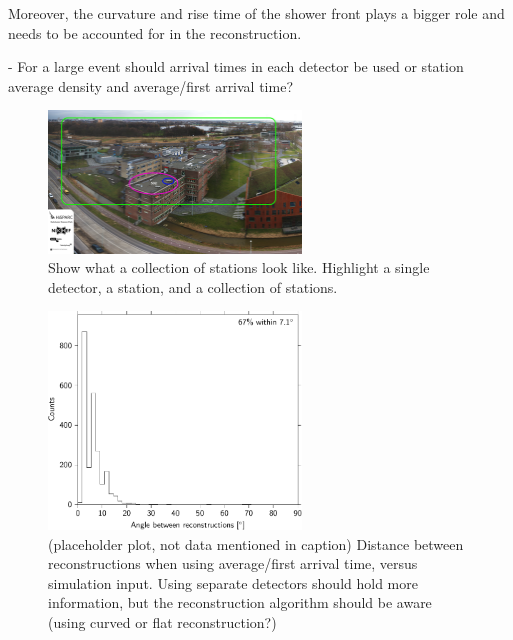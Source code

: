 Moreover, the curvature and rise time of the shower front plays a bigger role and needs to be accounted for in the reconstruction.

- For a large event should arrival times in each detector be used or station average density and average/first arrival time?

\begin{figure}
    \centering
    \includegraphics[width=0.6\textwidth]
                    {plots/experiment/ADL_151373_151429_layers.jpg}
    \caption{Show what a collection of stations look like. Highlight a single detector, a station, and a collection of stations.}
    \label{fig:ADL_151373_151429_layers}
\end{figure}




\begin{figure}
    \centering
    \includegraphics[width=0.6\textwidth]
                    {plots/experiment/angle_between_501_minn16_510}
    \caption{(placeholder plot, not data mentioned in caption) Distance between reconstructions when using average/first arrival time, versus simulation input. Using separate detectors should hold more information, but the reconstruction algorithm should be aware (using curved or flat reconstruction?)}
    \label{fig:angle_between_501_minn16_510}
\end{figure}
